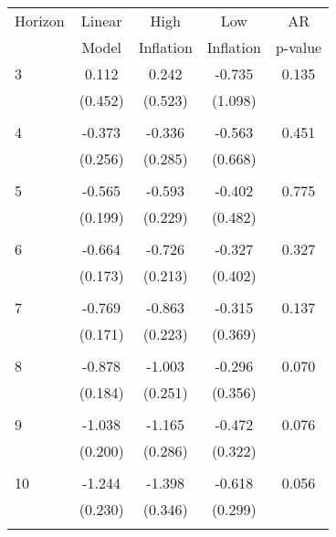 \begin{tabular}{l*{1}{cccc}}
\hline\hline
 Horizon  & Linear & High                 & Low           & AR            \\
                  & Model         & Inflation & Inflation & p-value       \\
\hline
   3       & 0.112 & 0.242 & -0.735 & 0.135 \\
          & (0.452) & (0.523) & (1.098) & \\
 & & & &\\
   4       & -0.373 & -0.336 & -0.563 & 0.451 \\
          & (0.256) & (0.285) & (0.668) & \\
 & & & &\\
   5       & -0.565 & -0.593 & -0.402 & 0.775 \\
          & (0.199) & (0.229) & (0.482) & \\
 & & & &\\
   6       & -0.664 & -0.726 & -0.327 & 0.327 \\
          & (0.173) & (0.213) & (0.402) & \\
 & & & &\\
   7       & -0.769 & -0.863 & -0.315 & 0.137 \\
          & (0.171) & (0.223) & (0.369) & \\
 & & & &\\
   8       & -0.878 & -1.003 & -0.296 & 0.070 \\
          & (0.184) & (0.251) & (0.356) & \\
 & & & &\\
   9       & -1.038 & -1.165 & -0.472 & 0.076 \\
          & (0.200) & (0.286) & (0.322) & \\
 & & & &\\
  10       & -1.244 & -1.398 & -0.618 & 0.056 \\
          & (0.230) & (0.346) & (0.299) & \\
 & & & &\\
\hline\hline
\end{tabular}
